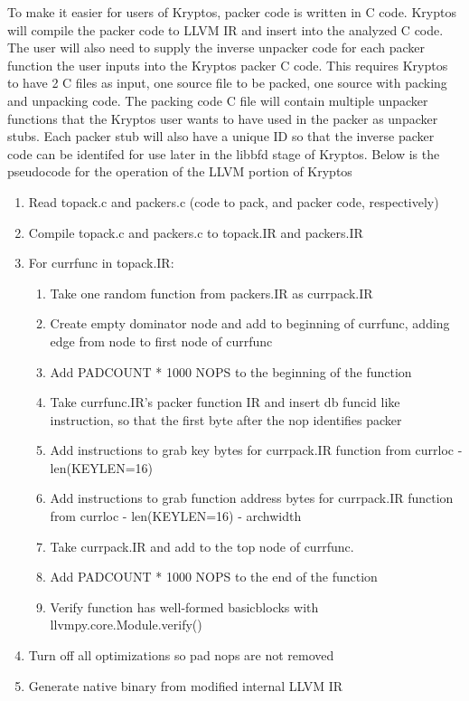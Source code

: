 \documentclass{article}
\begin{document}
To make it easier for users of Kryptos, packer code is written in C code. Kryptos will compile the packer code to LLVM IR and insert into the analyzed C code. The user will also need to supply the inverse unpacker code for each packer function the user inputs into the Kryptos packer C code. This requires Kryptos to have 2 C files as input, one source file to be packed, one source with packing and unpacking code. The packing code C file will contain multiple unpacker functions that the Kryptos user wants to have used in the packer as unpacker stubs. Each packer stub will also have a unique ID so that the inverse packer code can be identifed for use later in the libbfd stage of Kryptos. Below is the pseudocode for the operation of the LLVM portion of Kryptos
\begin{enumerate}
\item Read topack.c and packers.c (code to pack, and packer code, respectively)
\item Compile topack.c and packers.c to topack.IR and packers.IR
\item For currfunc in topack.IR:
\begin{enumerate}
\item Take one random function from packers.IR as currpack.IR
\item Create empty dominator node and add to beginning of currfunc, adding edge from node to first node of currfunc
\item Add PADCOUNT * 1000 NOPS to the beginning of the function
\item Take currfunc.IR's packer function IR and insert db {funcid} like instruction, so that the first byte after the nop identifies packer
\item Add instructions to grab key bytes for currpack.IR function from currloc - len(KEYLEN=16)
\item Add instructions to grab function address bytes for currpack.IR function from currloc - len(KEYLEN=16) - archwidth
\item Take currpack.IR and add to the top node of currfunc. 
\item Add PADCOUNT * 1000 NOPS to the end of the function
\item Verify function has well-formed basicblocks with llvmpy.core.Module.verify()
\end{enumerate}
\item Turn off all optimizations so pad nops are not removed
\item Generate native binary from modified internal LLVM IR
\end{enumerate}
\end{document}
